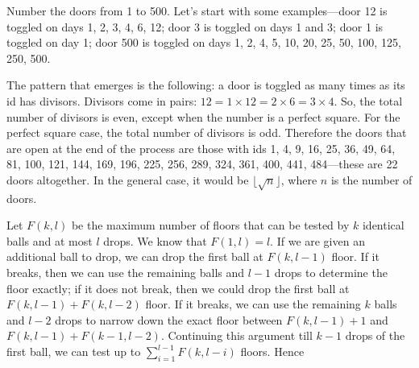 \begin{comment}
\ans{red-black}
For any search tree, the worst-case lookup time is dictated by its height.  We need to know the maximum
height a tree storing $n$ keys can have.  It is an elementary fact that there must be $n-1$
internal nodes in a search tree with $n$ keys.

We will now compute a bound on the height $h$
as a function of the number of internal nodes.
Let $H(n)$ be this quantity.
We claim that $H(n)$ is at most $2 \log(n+1)$.

We prove this by induction on $n$: it trivially holds for $n=0$ since the tree must consist of a single leaf and therefore have height $0$.

For the inductive step, consider a tree with $n+1$ internal nodes.  The root must be an internal node with
two children.

Note---seems to require the use of the Red-Black property, CLRS has a proof (page 274, Ed.~2).
Unless we stick to just proving an $O(\log n)$ bound.
\end{comment}

Number the doors from 1 to 500.
Let's start with some examples---door 12 is toggled on days 1, 2, 3, 4, 6, 12; door 3 is toggled
on days 1 and 3; door 1 is toggled on day 1; door 500 is toggled on days 1, 2, 4, 5, 10, 20, 25, 50, 100, 125, 250, 500.

The pattern that emerges is the following: a door is toggled as many times as its id has divisors.
Divisors come in pairs: $12 = 1\times 12 = 2\times 6 = 3\times 4$. So, the total number of divisors is even, except when the number is a perfect square.
For the perfect square case, the total number of divisors is odd.
Therefore the doors that are open at the end of the process are those with ids
1, 4, 9, 16, 25, 36, 49, 64, 81, 100, 121, 144, 169, 196, 225, 256, 289, 324,
361, 400, 441, 484---these are 22 doors altogether. In the general case, it
would be $\lfloor\sqrt{n}\rfloor$, where $n$ is the number of doors. 


Let $F(k,l)$ be the maximum number of floors that can be tested by
$k$ identical balls and at most $l$ drops. We know that $F(1,l) =
l$. If we are given an additional ball to drop, we can drop the first
ball at $F(k,l-1) $ floor. If it breaks, then we can use the
remaining balls and $l-1$ drops to determine the floor exactly; if it
does not break, then we could drop the first ball at $F(k,l-1)  +
F(k, l-2)$ floor. If it breaks, we can use the remaining $k$ balls
and $l-2$ drops to narrow down the exact floor between $F(k,l-1)  +
1$ and $F(k,l-1)  +
F(k-1, l-2)$.  Continuing this argument till $k-1$ drops of the first
ball, we can test up to $\sum_{i=1}^{l-1} F(k, l-i)$  floors. Hence

